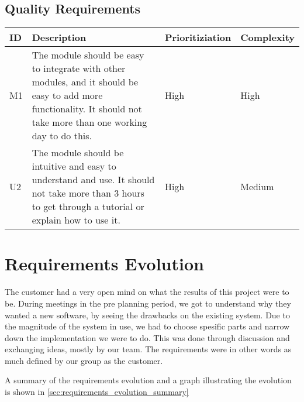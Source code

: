 \documentclass{report}
\begin{document}
\subsection{Quality Requirements} \label{subsec:quality_requirements}
\begin{tabular}{| l | p{5.9cm} | l | l |} \hline
ID & Description & Prioritiziation & Complexity \\ \hline
M1 & The module should be easy to integrate with other modules, and it should be easy to add more functionality. It should not take more than one working day to do this. & High & High \\ \hline
U2 & The module should be intuitive and easy to understand and use. It should not take more than 3 hours to get through a tutorial or explain how to use it. & High & Medium \\ \hline
\end{tabular}

\newpage
\section{Requirements Evolution} \label{sec:requirements_evolution}

The customer had a very open mind on what the results of this project were to be. During meetings in the pre planning period, we got to understand why they wanted a new software, by seeing the drawbacks on the existing system. Due to the magnitude of the system in use, we had to choose spesific parts and narrow down the implementation we were to do. This was done through discussion and exchanging ideas, mostly by our team. The requirements were in other words as much defined by our group as the customer.

A summary of the requirements evolution and a graph illustrating the evolution is shown in \ref{sec:requirements_evolution_summary}
\end{document}
